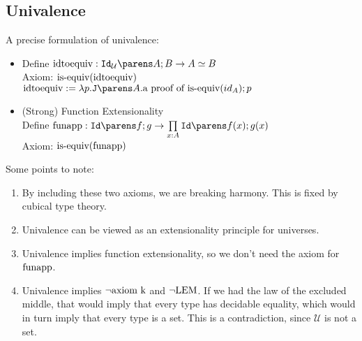 \documentclass[11pt]{article}
\newcommand{\U}{\ensuremath{\mathcal{U}}}
\newcommand{\isequiv}[1]{\ensuremath{\textnormal{is-equiv}(#1)}}
\newcommand{\idtoequiv}{\textnormal{idtoequiv}}
\newcommand{\funapp}{\textnormal{funapp}}
\begin{document}
\subsection{Univalence}
A precise formulation of univalence:
\begin{itemize}
\item Define $\oftype{\idtoequiv}{\idtype{\U}{A}{B} \rightarrow A \simeq B}$ \\
  Axiom:  $\isequiv{\idtoequiv}$ \\
  $\idtoequiv := \lambda p.\idJ{A}{\textnormal{a proof of \isequiv{id_A}}}{p}$

\item (Strong) Function Extensionality \\
  Define $\oftype{\funapp}{\idtype{f}{g}} \rightarrow \dfuntype{x}{A}{\idtype{f(x)}{g(x)}}$ \\
  Axiom:  $\isequiv{\funapp}$
\end{itemize}

Some points to note:
\begin{enumerate}
\item By including these two axioms, we are breaking harmony.  This is
  fixed by cubical type theory.
\item Univalence can be viewed as an extensionality principle for
  universes.
\item Univalence implies function extensionality, so we don't need the
  axiom for $\funapp$.
\item Univalence implies $\lnot\textnormal{axiom k}$ and
  $\lnot\textnormal{LEM}$.  If we had the law of the excluded
  middle, that would imply that every type has decidable equality,
  which would in turn imply that every type is a set.  This is a
  contradiction, since \U{} is not a set.
\end{enumerate}
\end{document}

